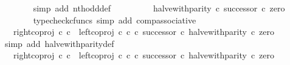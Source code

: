 \begin{isabellebody}
\ \ \ \ \ \ \isamarkupfalse%
\ {\isacharparenleft}{\kern0pt}simp\ add{\isacharcolon}{\kern0pt}\ nth{\isacharunderscore}{\kern0pt}odd{\isacharunderscore}{\kern0pt}def{}{\isacharparenright}{\kern0pt}\isanewline
\ \ \ \ \isamarkupfalse%
\ \isamarkupfalse%
\ {\isachardoublequoteopen}{\isachardot}{\kern0pt}{\isachardot}{\kern0pt}{\isachardot}{\kern0pt}\ {\isacharequal}{\kern0pt}\ {\isacharparenleft}{\kern0pt}halve{\isacharunderscore}{\kern0pt}with{\isacharunderscore}{\kern0pt}parity\ {\isasymcirc}\isactrlsub c\ successor{\isacharparenright}{\kern0pt}\ {\isasymcirc}\isactrlsub c\ zero{\isachardoublequoteclose}\isanewline
\ \ \ \ \ \ \isamarkupfalse%
\ {\isacharparenleft}{\kern0pt}typecheck{\isacharunderscore}{\kern0pt}cfuncs{\isacharcomma}{\kern0pt}\ simp\ add{\isacharcolon}{\kern0pt}\ comp{\isacharunderscore}{\kern0pt}associative{}{\isacharparenright}{\kern0pt}\isanewline
\ \ \ \ \isamarkupfalse%
\ \isamarkupfalse%
\ {\isachardoublequoteopen}{\isachardot}{\kern0pt}{\isachardot}{\kern0pt}{\isachardot}{\kern0pt}\ {\isacharequal}{\kern0pt}\ {\isacharparenleft}{\kern0pt}right{\isacharunderscore}{\kern0pt}coproj\ {\isasymnat}\isactrlsub c\ {\isasymnat}\isactrlsub c\ {\isasymamalg}\ {\isacharparenleft}{\kern0pt}left{\isacharunderscore}{\kern0pt}coproj\ {\isasymnat}\isactrlsub c\ {\isasymnat}\isactrlsub c\ {\isasymcirc}\isactrlsub c\ successor{\isacharparenright}{\kern0pt}\ {\isasymcirc}\isactrlsub c\ halve{\isacharunderscore}{\kern0pt}with{\isacharunderscore}{\kern0pt}parity{\isacharparenright}{\kern0pt}\ {\isasymcirc}\isactrlsub c\ zero{\isachardoublequoteclose}\isanewline
\ \ \ \ \ \ \isamarkupfalse%
\ {\isacharparenleft}{\kern0pt}simp\ add{\isacharcolon}{\kern0pt}\ halve{\isacharunderscore}{\kern0pt}with{\isacharunderscore}{\kern0pt}parity{\isacharunderscore}{\kern0pt}def{}{\isacharparenright}{\kern0pt}\isanewline
\ \ \ \ \isamarkupfalse%
\ \isamarkupfalse%
\ {\isachardoublequoteopen}{\isachardot}{\kern0pt}{\isachardot}{\kern0pt}{\isachardot}{\kern0pt}\ {\isacharequal}{\kern0pt}\ right{\isacharunderscore}{\kern0pt}coproj\ {\isasymnat}\isactrlsub c\ {\isasymnat}\isactrlsub c\ {\isasymamalg}\ {\isacharparenleft}{\kern0pt}left{\isacharunderscore}{\kern0pt}coproj\ {\isasymnat}\isactrlsub c\ {\isasymnat}\isactrlsub c\ {\isasymcirc}\isactrlsub c\ successor{\isacharparenright}{\kern0pt}\ {\isasymcirc}\isactrlsub c\ halve{\isacharunderscore}{\kern0pt}with{\isacharunderscore}{\kern0pt}parity\ {\isasymcirc}\isactrlsub c\ zero{\isachardoublequoteclose}\isanewline

\end{isabellebody}
